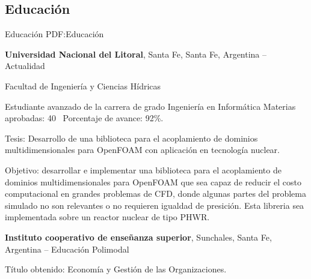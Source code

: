 \documentclass[letterpaper,MMMyyyy,nonstop]{simpleresumecv}
\begin{document}
\begin{body}


\section
{Educación}
{Educación}
{PDF:Educación}

\textbf{Universidad Nacional del Litoral},
Santa Fe, Santa Fe, Argentina
\hfill
{} --
Actualidad

\BulletItem Facultad de Ingeniería y Ciencias Hídricas
\begin{detail}
	\SubBulletItem
	Estudiante avanzado de la carrera de grado Ingeniería en Informática
	\SubBulletItem
	Materias aprobadas: 40 \SubBulletSymbol\, Porcentaje de avance: 92\%.

\end{detail}
\BulletItem	Tesis: Desarrollo de una biblioteca para el acoplamiento de dominios multidimensionales para OpenFOAM con aplicación en tecnología nuclear.
\begin{detail}
	\SubBulletItem
	Objetivo: desarrollar e implementar una biblioteca para el acoplamiento de dominios multidimensionales para OpenFOAM que sea capaz de reducir el costo computacional en grandes problemas de CFD, donde algunas partes del problema simulado no son relevantes o no requieren igualdad de presición. Esta libreria sea implementada sobre un reactor nuclear de tipo PHWR.
\end{detail}

\BigGap
\textbf{Instituto cooperativo de enseñanza superior},
Sunchales, Santa Fe, Argentina
\hfill
{} --
\BulletItem Educación Polimodal
\begin{detail}
	\SubBulletItem
	Título obtenido: Economía y Gestión de las Organizaciones.
\end{detail}




%
%


\end{body}
\end{document}
